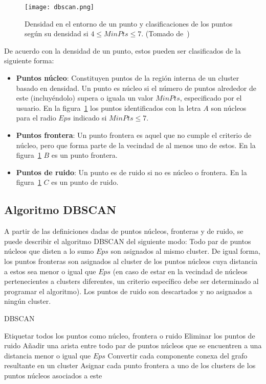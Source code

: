 \begin{figure}[!h]
    \centering
    \texttt{[image: dbscan.png]}
    \caption{Densidad en el entorno de un punto y clasificaciones de los puntos según su densidad si $4 \leq MinPts \leq 7$. (Tomado de~\cite{Tan05})}
    \label{img:dbscan}
\end{figure}

De acuerdo con la densidad de un punto, estos pueden ser clasificados de la siguiente forma:

\begin{itemize}
    \item \textbf{Puntos núcleo}: Constituyen puntos de la región interna de un cluster basado en densidad.
    Un punto es núcleo si el número de puntos alrededor de este (incluyéndolo) supera o iguala un valor $MinPts$, especificado por el usuario.
    En la figura~\ref{img:dbscan} los puntos identificados con la letra $A$ son núcleos para el radio $Eps$ indicado si $MinPts\leq 7$.
    \item \textbf{Puntos frontera}: Un punto frontera es aquel que no cumple el criterio de núcleo, pero que forma parte de la vecindad de al menos uno de estos.
    En la figura~\ref{img:dbscan} $B$ es un punto frontera.
    \item \textbf{Puntos de ruido}: Un punto es de ruido si no es núcleo o frontera.
    En la figura~\ref{img:dbscan} $C$ es un punto de ruido.
\end{itemize}

\subsection{Algoritmo DBSCAN}\label{subsec:DBSCAN}

A partir de las definiciones dadas de puntos núcleos, fronteras y de ruido, se puede describir el algoritmo DBSCAN del siguiente modo: Todo par de puntos núcleos que disten a lo sumo $Eps$ son asignados al mismo cluster.
De igual forma, los puntos fronteras son asignados al cluster de los puntos núcleos cuya distancia a estos sea menor o igual que $Eps$ (en caso de estar en la vecindad de núcleos pertenecientes a clusters diferentes, un criterio específico debe ser determinado al programar el algoritmo).
Los puntos de ruido son descartados y no asignados a ningún cluster.

\begin{algorithm}
    \caption{DBSCAN}
    \label{algorithm:DBSCAN}
    Etiquetar todos los puntos como núcleo, frontera o ruido\;
    Eliminar los puntos de ruido\;
    Añadir una arista entre todo par de puntos núcleos que se encuentren a una distancia menor o igual que $Eps$\;
    Convertir cada componente conexa del grafo resultante en un cluster\;
    Asignar cada punto frontera a uno de los clusters de los puntos núcleos asociados a este\;
\end{algorithm}

